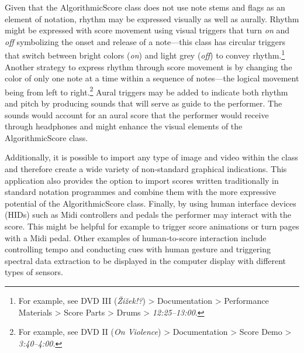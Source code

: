 Given that the AlgorithmicScore class does not use note stems and flags as an element of notation, rhythm may be expressed visually as well as aurally. Rhythm might be expressed with score movement using visual triggers that turn \emph{on} and \emph{off} symbolizing the onset and release of a note---this class has circular triggers that switch between bright colors (\emph{on}) and light grey (\emph{off}) to convey rhythm.\footnote{For example, see DVD III (\emph{\v{Z}i\v{z}ek!?}) \tiny \textgreater \footnotesize \hspace{0pt} Documentation \tiny \textgreater \footnotesize \hspace{0pt} Performance Materials \tiny \textgreater \footnotesize \hspace{0pt} Score Parts \tiny \textgreater \footnotesize \hspace{0pt} Drums \tiny \textgreater \footnotesize \hspace{0pt} \mbox{\emph{12:25--13:00}}.} Another strategy to express rhythm through score movement is by changing the color of only one note at a time within a sequence of notes---the logical movement being from left to right.\footnote{For example, see DVD II (\emph{On Violence}) \tiny \textgreater \footnotesize \hspace{0pt} Documentation \tiny \textgreater \footnotesize \hspace{0pt} Score Demo \tiny \textgreater \footnotesize  \hspace{0pt} \mbox{\emph{3:40--4:00}}.} Aural triggers may be added to indicate both rhythm and pitch by producing sounds that will serve as guide to the performer. The sounds would account for an aural score that the performer would receive through headphones and might enhance the visual elements of the AlgorithmicScore class.

Additionally, it is possible to import any type of image and video within the class and therefore create a wide variety of non-standard graphical indications. This application also provides the option to import scores written traditionally in standard notation programmes and combine them with the more expressive potential of the AlgorithmicScore class. Finally, by using human interface devices (HIDs) such as Midi controllers and pedals the performer may interact with the score. This might be helpful for example to trigger score animations or turn pages with a Midi pedal. Other examples of human-to-score interaction include controlling tempo and conducting cues with human gesture and triggering spectral data extraction to be displayed in the computer display with different types of sensors. 

